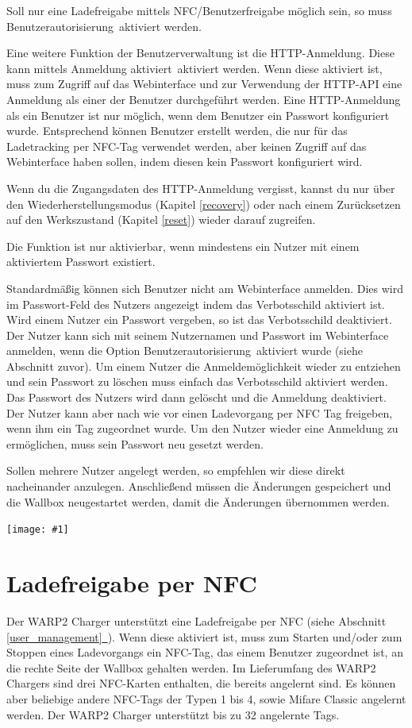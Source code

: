 \documentclass[a4paper,10pt]{article}
\newcommand{\hint}[1]{\begin{tcolorbox}[colback=boxgray,colframe=black,coltext=
white,title=Hinweis,left*=2mm,right*=2mm,boxsep=1mm,bottom=1mm,top=1mm]#1\end{tcolorbox}}
\newcommand{\gfx}[1]{\texttt{[image: \#1]}}
\newcommand*{\fullref}[1]{\hyperref[{#1}]{\ref*{#1}~\nameref*{#1}}}
\begin{document}
\begin{multicols*}{2}
	Soll nur eine Ladefreigabe mittels NFC/Benutzerfreigabe möglich sein, so
	muss \glqq Benutzerautorisierung\grqq~aktiviert werden.

	Eine weitere Funktion der Benutzerverwaltung ist die HTTP-Anmeldung. Diese
	kann mittels \glqq Anmeldung aktiviert\grqq~aktiviert werden. Wenn diese aktiviert ist, muss zum Zugriff auf das Webinterface und zur Verwendung
	der HTTP-API eine Anmeldung als einer der Benutzer durchgeführt werden. Eine HTTP-Anmeldung als ein Benutzer ist nur möglich, wenn
	dem Benutzer ein Passwort konfiguriert wurde. Entsprechend können Benutzer erstellt werden, die nur für das Ladetracking per NFC-Tag
	verwendet werden, aber keinen Zugriff auf das Webinterface haben sollen, indem diesen kein Passwort konfiguriert wird.
	\hint{Wenn du die Zugangsdaten des HTTP-Anmeldung vergisst, kannst du nur
	über den Wiederherstellungsmodus (Kapitel \ref{recovery}) oder nach einem
	Zurücksetzen auf den Werkszustand (Kapitel \ref{reset}) wieder darauf zugreifen.}
	Die Funktion ist nur aktivierbar, wenn mindestens ein Nutzer mit einem
	aktiviertem Passwort existiert.

	Standardmäßig können sich Benutzer nicht am Webinterface anmelden. Dies wird
	im Passwort-Feld des Nutzers angezeigt indem das Verbotsschild aktiviert
	ist. Wird einem Nutzer ein Passwort vergeben, so ist das Verbotsschild
	deaktiviert. Der Nutzer kann sich mit seinem Nutzernamen und Passwort im
	Webinterface anmelden, wenn die Option \glqq
	Benutzerautorisierung\grqq~aktiviert wurde (siehe Abschnitt zuvor).
	Um einem Nutzer die Anmeldemöglichkeit wieder zu entziehen und sein Passwort
	zu löschen muss einfach das Verbotsschild aktiviert werden. Das Passwort des
	Nutzers wird dann gelöscht und die Anmeldung deaktiviert. Der Nutzer kann
	aber nach wie vor einen Ladevorgang per NFC Tag freigeben, wenn ihm ein Tag
	zugeordnet wurde. Um den Nutzer wieder eine Anmeldung zu ermöglichen, muss
	sein Passwort neu gesetzt werden.

	Sollen mehrere Nutzer angelegt werden, so empfehlen wir diese direkt
	nacheinander anzulegen. Anschließend müssen die Änderungen gespeichert und
	die Wallbox neugestartet werden, damit die Änderungen übernommen werden.

	\gfx{./img_warp2/resized/web_users}

	\newpage
	\section{Ladefreigabe per NFC}
	\label{NFC}
	Der WARP2 Charger unterstützt eine Ladefreigabe per NFC (siehe Abschnitt
	\fullref{user_management}). Wenn diese aktiviert ist,
	muss zum Starten und/oder zum Stoppen eines Ladevorgangs ein NFC-Tag, das einem Benutzer zugeordnet ist, an die rechte Seite
	der Wallbox gehalten werden. Im Lieferumfang des WARP2 Chargers sind drei NFC-Karten enthalten,
	die bereits angelernt sind. Es können aber beliebige andere NFC-Tags der Typen 1 bis 4,
	sowie Mifare Classic angelernt werden. Der WARP2 Charger unterstützt bis zu 32 angelernte Tags.


\end{multicols*}
\end{document}
